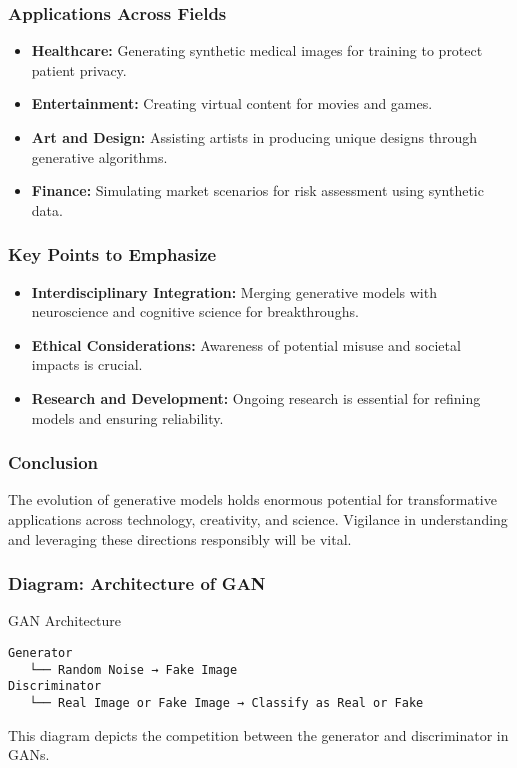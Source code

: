 \documentclass[aspectratio=169]{beamer}
\begin{document}
\begin{frame}[fragile]
    \frametitle{Applications Across Fields}
    \begin{itemize}
        \item \textbf{Healthcare:} Generating synthetic medical images for training to protect patient privacy.
        \item \textbf{Entertainment:} Creating virtual content for movies and games.
        \item \textbf{Art and Design:} Assisting artists in producing unique designs through generative algorithms.
        \item \textbf{Finance:} Simulating market scenarios for risk assessment using synthetic data.
    \end{itemize}
\end{frame}

\begin{frame}[fragile]
    \frametitle{Key Points to Emphasize}
    \begin{itemize}
        \item \textbf{Interdisciplinary Integration:} Merging generative models with neuroscience and cognitive science for breakthroughs.
        \item \textbf{Ethical Considerations:} Awareness of potential misuse and societal impacts is crucial.
        \item \textbf{Research and Development:} Ongoing research is essential for refining models and ensuring reliability.
    \end{itemize}
\end{frame}

\begin{frame}[fragile]
    \frametitle{Conclusion}
    The evolution of generative models holds enormous potential for transformative applications across technology, creativity, and science. Vigilance in understanding and leveraging these directions responsibly will be vital.
\end{frame}

\begin{frame}[fragile]
    \frametitle{Diagram: Architecture of GAN}
    \begin{block}{GAN Architecture}
        \begin{lstlisting}
Generator
   └── Random Noise → Fake Image
Discriminator
   └── Real Image or Fake Image → Classify as Real or Fake
        \end{lstlisting}
    \end{block}
    This diagram depicts the competition between the generator and discriminator in GANs.
\end{frame}
\end{document}
